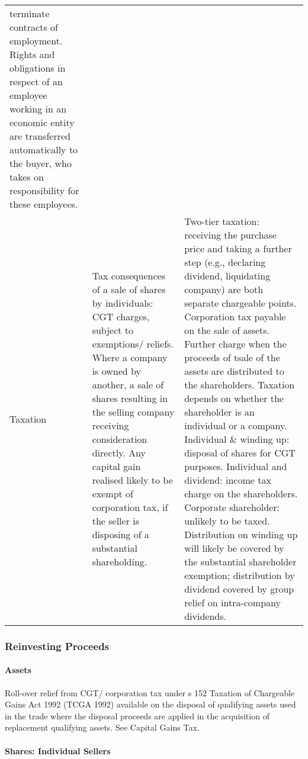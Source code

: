 \documentclass[
]{article}
\begin{document}
\begin{longtable}[]{@{}lll@{}}
terminate contracts of employment. Rights and obligations in respect of
an employee working in an economic entity are transferred automatically
to the buyer, who takes on responsibility for these employees. \\
Taxation & Tax consequences of a sale of shares by individuals: CGT
charges, subject to exemptions/ reliefs. Where a company is owned by
another, a sale of shares resulting in the selling company receiving
consideration directly. Any capital gain realised likely to be exempt of
corporation tax, if the seller is disposing of a substantial
shareholding. & Two-tier taxation: receiving the purchase price and
taking a further step (e.g., declaring dividend, liquidating company)
are both separate chargeable points. Corporation tax payable on the sale
of assets. Further charge when the proceeds of tsale of the assets are
distributed to the shareholders. Taxation depends on whether the
shareholder is an individual or a company. Individual \& winding up:
disposal of shares for CGT purposes. Individual and dividend: income tax
charge on the shareholders. Corporate shareholder: unlikely to be taxed.
Distribution on winding up will likely be covered by the substantial
shareholder exemption; distribution by dividend covered by group relief
on intra-company dividends. \\
\bottomrule()
\end{longtable}

\hypertarget{reinvesting-proceeds}{%
\subsubsection{Reinvesting Proceeds}\label{reinvesting-proceeds}}

\hypertarget{assets}{%
\paragraph{Assets}\label{assets}}

Roll-over relief from CGT/ corporation tax under s 152 Taxation of
Chargeable Gains Act 1992 (TCGA 1992) available on the disposal of
qualifying assets used in the trade where the disposal proceeds are
applied in the acquisition of replacement qualifying assets. See Capital
Gains Tax.

\hypertarget{shares-individual-sellers}{%
\paragraph{Shares: Individual Sellers}\label{shares-individual-sellers}}
\end{document}
